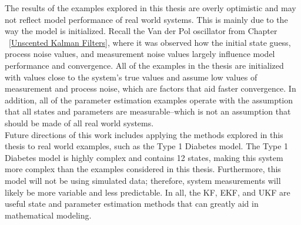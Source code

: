 \noindent The results of the examples explored in this thesis are overly optimistic and may not reflect model performance of real world systems. This is mainly due to the way the model is initialized. Recall the Van der Pol oscillator from Chapter ~\ref{Unscented Kalman Filters}, where it was observed how the initial state guess, process noise values, and measurement noise values largely influence model performance and convergence. All of the examples in the thesis are initialized with values close to the system's true values and assume low values of measurement and process noise, which are factors that aid faster convergence. In addition, all of the parameter estimation examples operate with the assumption that all states and parameters are measurable--which is not an assumption that should be made of all real world systems. \\ 

\noindent Future directions of this work includes applying the methods explored in this thesis to real world examples, such as the Type 1 Diabetes model. The Type 1 Diabetes model is highly complex and contains 12 states, making this system more complex than the examples considered in this thesis. Furthermore, this model will not be using simulated data; therefore, system measurements will likely be more variable and less predictable. In all, the KF, EKF, and UKF are useful state and parameter estimation methods that can greatly aid in mathematical modeling.